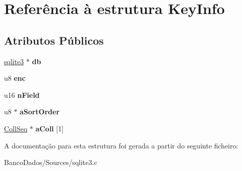 \hypertarget{struct_key_info}{\section{Referência à estrutura Key\-Info}
\label{struct_key_info}
}
\subsection*{Atributos Públicos}
\begin{DoxyCompactItemize}
\item 
\hypertarget{struct_key_info_af2e7a3a411f5ca1ccf6de77d320b59db}{\hyperlink{structsqlite3}{sqlite3} $\ast$ {\bfseries db}}\label{struct_key_info_af2e7a3a411f5ca1ccf6de77d320b59db}

\item 
\hypertarget{struct_key_info_a37972825f9a148668e979be12465e832}{u8 {\bfseries enc}}\label{struct_key_info_a37972825f9a148668e979be12465e832}

\item 
\hypertarget{struct_key_info_af70436487a95e445d540bfc4ca1d3f0b}{u16 {\bfseries n\-Field}}\label{struct_key_info_af70436487a95e445d540bfc4ca1d3f0b}

\item 
\hypertarget{struct_key_info_ac5fe4bd0172a1f11f41f678528a7b21e}{u8 $\ast$ {\bfseries a\-Sort\-Order}}\label{struct_key_info_ac5fe4bd0172a1f11f41f678528a7b21e}

\item 
\hypertarget{struct_key_info_ad43aa024fca5a065e75d8e24b231adcb}{\hyperlink{struct_coll_seq}{Coll\-Seq} $\ast$ {\bfseries a\-Coll} \mbox{[}1\mbox{]}}\label{struct_key_info_ad43aa024fca5a065e75d8e24b231adcb}

\end{DoxyCompactItemize}


A documentação para esta estrutura foi gerada a partir do seguinte ficheiro\-:\begin{DoxyCompactItemize}
\item 
Banco\-Dados/\-Sources/sqlite3.\-c\end{DoxyCompactItemize}
